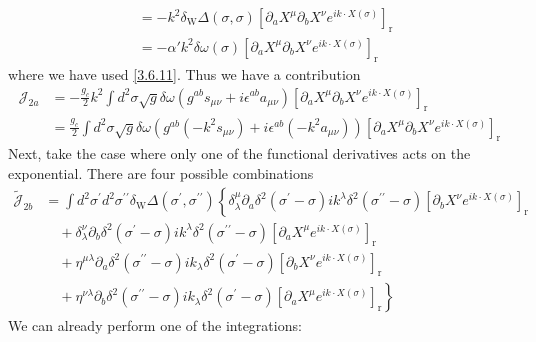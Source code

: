 \begin{tcolorbox}[breakable]
\begin{align}
			&= -k^2 \delta_{\mathrm{W}} \Delta(\sigma, \sigma)\left[\partial_a X^\mu \partial_b X^\nu e^{i k \cdot X(\sigma)}\right]_{\mathrm{r}} \nonumber \\
			&= -\alpha' k^2 \delta \omega(\sigma)\left[\partial_a X^\mu \partial_b X^\nu e^{i k \cdot X(\sigma)}\right]_{\mathrm{r}}
		\end{align}
		where we have used \eqref{3.6.11}. Thus we have a contribution
		\begin{align}
			\mathcal{J}_{2 a} &= -\frac{g_c}{2} k^2 \int d^2 \sigma \sqrt{g} \delta \omega\left(g^{a b} s_{\mu \nu}+i \epsilon^{a b} a_{\mu \nu}\right)\left[\partial_a X^\mu \partial_b X^\nu e^{i k \cdot X(\sigma)}\right]_{\mathrm{r}} \nonumber \\
			&= \frac{g_c}{2} \int d^2 \sigma \sqrt{g} \delta \omega\left(g^{a b}\left(-k^2 s_{\mu \nu}\right)+i \epsilon^{a b}\left(-k^2 a_{\mu \nu}\right)\right)\left[\partial_a X^\mu \partial_b X^\nu e^{i k \cdot X(\sigma)}\right]_{\mathrm{r}}
		\end{align}
		Next, take the case where only one of the functional derivatives acts on the exponential. There are four possible combinations
		\begin{align}
			\tilde{\mathcal{J}}_{2 b} &= \int d^2 \sigma^{\prime} d^2 \sigma^{\prime \prime} \delta_{\mathrm{W}} \Delta\left(\sigma^{\prime}, \sigma^{\prime \prime}\right)\left\{\delta_\lambda^\mu \partial_a \delta^2\left(\sigma^{\prime}-\sigma\right) i k^\lambda \delta^2\left(\sigma^{\prime \prime}-\sigma\right)\left[\partial_b X^\nu e^{i k \cdot X(\sigma)}\right]_{\mathrm{r}}\right. \nonumber \\
			&\quad + \delta_\lambda^\nu \partial_b \delta^2\left(\sigma^{\prime}-\sigma\right) i k^\lambda \delta^2\left(\sigma^{\prime \prime}-\sigma\right)\left[\partial_a X^\mu e^{i k \cdot X(\sigma)}\right]_{\mathrm{r}} \nonumber \\
			&\quad + \eta^{\mu \lambda} \partial_a \delta^2\left(\sigma^{\prime \prime}-\sigma\right) i k_\lambda \delta^2\left(\sigma^{\prime}-\sigma\right)\left[\partial_b X^\nu e^{i k \cdot X(\sigma)}\right]_{\mathrm{r}} \nonumber \\
			&\left.\quad + \eta^{\nu \lambda} \partial_b \delta^2\left(\sigma^{\prime \prime}-\sigma\right) i k_\lambda \delta^2\left(\sigma^{\prime}-\sigma\right)\left[\partial_a X^\mu e^{i k \cdot X(\sigma)}\right]_{\mathrm{r}}\right\}
		\end{align}
		We can already perform one of the integrations:
		\begin{align}

\end{align}
\end{tcolorbox}

